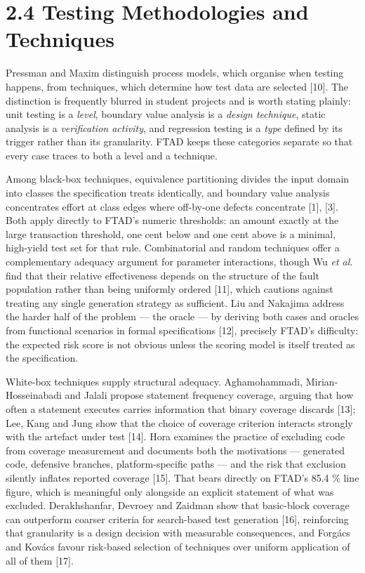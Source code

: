 \documentclass[
  12pt,
]{report}
\begin{document}
\section{2.4 Testing Methodologies and
Techniques}\label{testing-methodologies-and-techniques}

Pressman and Maxim distinguish process models, which organise when
testing happens, from techniques, which determine how test data are
selected {[}10{]}. The distinction is frequently blurred in student
projects and is worth stating plainly: unit testing is a \emph{level},
boundary value analysis is a \emph{design technique}, static analysis is
a \emph{verification activity}, and regression testing is a \emph{type}
defined by its trigger rather than its granularity. FTAD keeps these
categories separate so that every case traces to both a level and a
technique.

Among black-box techniques, equivalence partitioning divides the input
domain into classes the specification treats identically, and boundary
value analysis concentrates effort at class edges where off-by-one
defects concentrate {[}1{]}, {[}3{]}. Both apply directly to FTAD's
numeric thresholds: an amount exactly at the large transaction
threshold, one cent below and one cent above is a minimal, high-yield
test set for that rule. Combinatorial and random techniques offer a
complementary adequacy argument for parameter interactions, though Wu
\emph{et al.} find that their relative effectiveness depends on the
structure of the fault population rather than being uniformly ordered
{[}11{]}, which cautions against treating any single generation strategy
as sufficient. Liu and Nakajima address the harder half of the problem
--- the oracle --- by deriving both cases and oracles from functional
scenarios in formal specifications {[}12{]}, precisely FTAD's
difficulty: the expected risk score is not obvious unless the scoring
model is itself treated as the specification.

White-box techniques supply structural adequacy. Aghamohammadi,
Mirian-Hosseinabadi and Jalali propose statement frequency coverage,
arguing that how often a statement executes carries information that
binary coverage discards {[}13{]}; Lee, Kang and Jung show that the
choice of coverage criterion interacts strongly with the artefact under
test {[}14{]}. Hora examines the practice of excluding code from
coverage measurement and documents both the motivations --- generated
code, defensive branches, platform-specific paths --- and the risk that
exclusion silently inflates reported coverage {[}15{]}. That bears
directly on FTAD's 85.4 \% line figure, which is meaningful only
alongside an explicit statement of what was excluded. Derakhshanfar,
Devroey and Zaidman show that basic-block coverage can outperform
coarser criteria for search-based test generation {[}16{]}, reinforcing
that granularity is a design decision with measurable consequences, and
Forgács and Kovács favour risk-based selection of techniques over
uniform application of all of them {[}17{]}.
\end{document}

